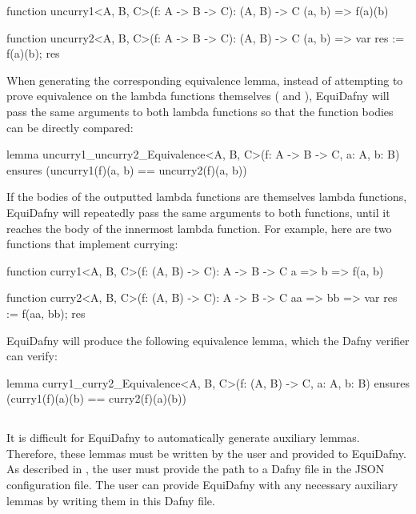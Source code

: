\begin{dafny}
function uncurry1<A, B, C>(f: A -> B -> C): (A, B) -> C {
    (a, b) => f(a)(b)
}

function uncurry2<A, B, C>(f: A -> B -> C): (A, B) -> C {
    (a, b) => var res := f(a)(b); res
}
\end{dafny}
%
When generating the corresponding equivalence lemma, instead of attempting to prove equivalence on the lambda functions themselves ( and ), EquiDafny will pass the same arguments to both lambda functions so that the function bodies can be directly compared:

\begin{dafny}
lemma uncurry1_uncurry2_Equivalence<A, B, C>(f: A -> B -> C, a: A, b: B)
ensures (uncurry1(f)(a, b) == uncurry2(f)(a, b))
{}
\end{dafny}
%
If the bodies of the outputted lambda functions are themselves lambda functions, EquiDafny will repeatedly pass the same arguments to both functions, until it reaches the body of the innermost lambda function. For example, here are two functions that implement currying:

\begin{dafny}
function curry1<A, B, C>(f: (A, B) -> C): A -> B -> C {
    a => b => f(a, b)
}

function curry2<A, B, C>(f: (A, B) -> C): A -> B -> C {
    aa => bb => var res := f(aa, bb); res
}
\end{dafny}
%

EquiDafny will produce the following equivalence lemma, which the Dafny verifier can verify:
\begin{dafny}
lemma curry1_curry2_Equivalence<A, B, C>(f: (A, B) -> C, a: A, b: B)
ensures (curry1(f)(a)(b) == curry2(f)(a)(b))
{}
\end{dafny}
%

\subsection{}\label{sec:addressing-auxiliary-lemmas}
It is difficult for EquiDafny to automatically generate auxiliary lemmas. Therefore, these lemmas must be written by the user and provided to EquiDafny. As described in , the user must provide the path to a Dafny file in the JSON configuration file. The user can provide EquiDafny with any necessary auxiliary lemmas by writing them in this Dafny file.

